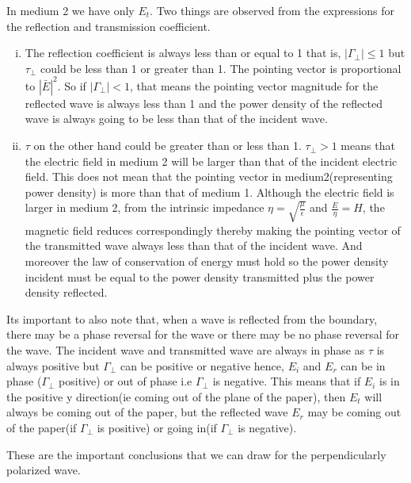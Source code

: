 In medium 2 we have only $E_{t}$. Two things are observed from the expressions for the reflection and transmission coefficient.
\begin{enumerate}[(i)]
\item The reflection coefficient is always  less than or equal to 1 that is, $|\Gamma_{\bot}| \leq 1$ but $\tau_{\bot}$ could be less than 1 or greater than 1. The pointing vector is proportional  to $|\bar{E}|^{2}$. So if $|\Gamma_{\bot}|< 1$, that means the pointing vector magnitude for the reflected wave is always less than 1 and the power density of the reflected wave is always going to be less than that of the incident wave.
\item $\tau$ on the other hand could be greater than or less than 1.  $\tau_{\bot} > 1$ means that the electric field in medium 2 will be larger than that of the incident electric field. This does not mean that the pointing vector in medium2(representing power density) is more than that of medium 1. Although the electric field is larger in medium 2, from the intrinsic impedance $\eta=\sqrt{\frac{\mu}{\epsilon}}$ and $\frac{E}{\eta} =H$, the magnetic field reduces correspondingly thereby making the pointing vector of the transmitted wave always less than that of the incident wave. And moreover the law of conservation of energy must hold so the power density incident must be equal to the power density transmitted plus the power density reflected.
\end{enumerate}
Its important to also note that, when a wave is reflected from the boundary, there may be a phase reversal for the wave or there may be no phase reversal for the wave. The incident wave and transmitted wave are always in phase as $\tau$ is always positive but $\Gamma_{\perp}$ can be positive or negative hence, $E_{i}$ and $E_{r}$ can be in phase ($\Gamma_{\perp}$ positive) or out of phase i.e $\Gamma_{\perp}$ is negative. This means that if $E_{i}$ is in the positive y direction(ie coming out of the plane of the paper), then $E_{t}$ will always be coming out of the paper, but the reflected wave $E_{r}$ may be coming out of the paper(if $\Gamma_{\perp}$ is positive) or going in(if $\Gamma_{\perp}$ is negative).

These are the important conclusions that we can draw for the perpendicularly polarized wave.

